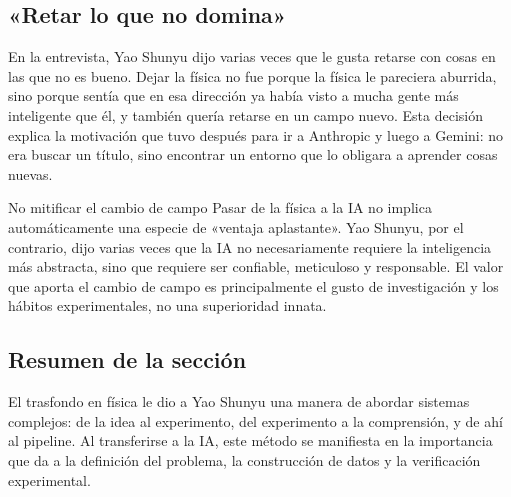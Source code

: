 \subsection{«Retar lo que no domina»}

En la entrevista, Yao Shunyu dijo varias veces que le gusta retarse con cosas en las que no es bueno. Dejar la física no fue porque la física le pareciera aburrida, sino porque sentía que en esa dirección ya había visto a mucha gente más inteligente que él, y también quería retarse en un campo nuevo. Esta decisión explica la motivación que tuvo después para ir a Anthropic y luego a Gemini: no era buscar un título, sino encontrar un entorno que lo obligara a aprender cosas nuevas.

\begin{warningbox}{No mitificar el cambio de campo}
Pasar de la física a la IA no implica automáticamente una especie de «ventaja aplastante». Yao Shunyu, por el contrario, dijo varias veces que la IA no necesariamente requiere la inteligencia más abstracta, sino que requiere ser confiable, meticuloso y responsable. El valor que aporta el cambio de campo es principalmente el gusto de investigación y los hábitos experimentales, no una superioridad innata.
\end{warningbox}

\subsection{Resumen de la sección}

El trasfondo en física le dio a Yao Shunyu una manera de abordar sistemas complejos: de la idea al experimento, del experimento a la comprensión, y de ahí al pipeline. Al transferirse a la IA, este método se manifiesta en la importancia que da a la definición del problema, la construcción de datos y la verificación experimental.
